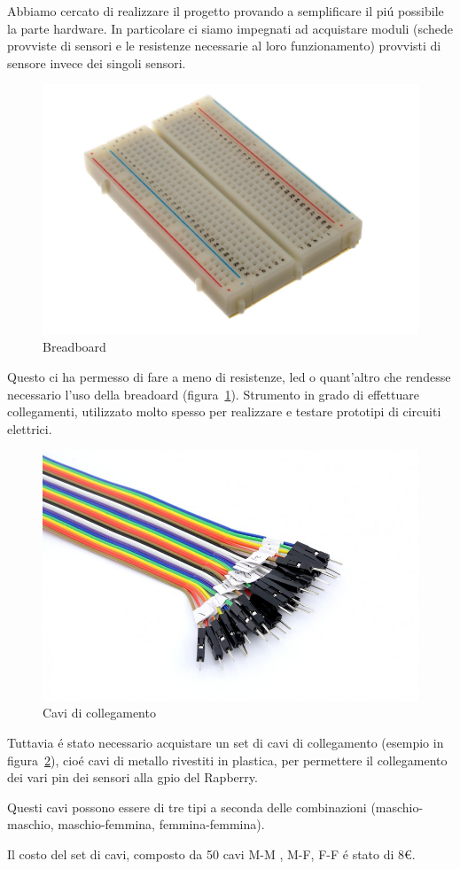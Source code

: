 Abbiamo cercato di realizzare il progetto provando a semplificare il pi\'u possibile la parte hardware.
In particolare ci siamo impegnati ad acquistare moduli (schede provviste di sensori e le resistenze necessarie al loro funzionamento) provvisti di sensore invece dei singoli sensori.

\begin{figure}
	\centering
	\includegraphics[width=0.7\linewidth]{Figures/Sensors&Rasp/breadboard}
	\caption[breadb]{Breadboard}
	\label{fig:bb}
\end{figure}

Questo ci ha permesso di fare a meno di resistenze, led o quant'altro che rendesse necessario l'uso della breadoard (figura~\ref{fig:bb}).
Strumento in grado di effettuare collegamenti, utilizzato molto spesso per realizzare e testare prototipi di circuiti elettrici.

\begin{figure}
	\centering
	\includegraphics[width=0.7\linewidth]{Figures/Sensors&Rasp/cables}
	\caption[cable]{Cavi di collegamento}
	\label{fig:cables}
\end{figure}

\newpage

Tuttavia \'e stato necessario acquistare un set di cavi di collegamento (esempio in figura~\ref{fig:cables}), cio\'e cavi di metallo rivestiti in plastica, per permettere il collegamento dei vari pin dei sensori alla gpio del Rapberry.

Questi cavi possono essere di tre tipi a seconda delle combinazioni (maschio-maschio, maschio-femmina, femmina-femmina).

Il costo del set di cavi, composto da 50 cavi M-M , M-F, F-F \'e stato di 8€.

\newpage
